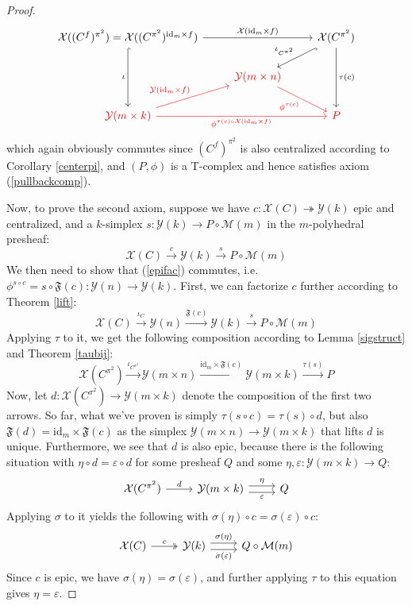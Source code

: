 \documentclass{article}
\theoremstyle{remark}
\theoremstyle{definition}
\newcommand{\id}{\mathrm{id}}
\newcommand{\Y}{\mathcal Y}
\newcommand{\X}{\mathcal X}
\newcommand{\F}{\mathfrak F}
\newcommand{\M}{\mathcal M}
\begin{document}
\begin{proof}
\[\begin{tikzcd}
			\X((C^f)^{\pi^2})=\X((C^{\pi^2})^{\id_m\times f})\arrow[hook]{dd}[swap]{\iota}\arrow{rr}{\X(\id_m\times f)}&&\X(C^{\pi^2})\arrow[hook]{ld}[swap]{\iota_{C^{\pi^2}}}\arrow{dd}{\tau(c)}\\
			&\color{red}{\Y(m\times n)}\arrow[color=red]{dr}[swap]{\phi^{\tau(c)}}\\
			\color{red}{\Y(m\times k)}\arrow[color=red]{ur}{\Y(\id_m\times f)}\arrow[color=red]{rr}[swap]{\phi^{\tau(c)\circ\X(\id_m\times f)}}&&\color{red}P
		\end{tikzcd}\]
		which again obviously commutes since $(C^f)^{\pi^2}$ is also centralized according to Corollary \ref{centerpi}, and $(P,\phi)$ is a T-complex and hence satisfies axiom (\ref{pullbackcomp}).
		
		Now, to prove the second axiom, suppose we have $c:\X(C)\twoheadrightarrow\Y(k)$ epic and centralized, and a $k$-simplex $s:\Y(k)\to P\circ\M(m)$ in the $m$-polyhedral presheaf:
		\[\X(C)\xrightarrow{c}\Y(k)\xrightarrow{s}P\circ\M(m)\]
		We then need to show that (\ref{epifac}) commutes, i.e. $\phi^{s\circ c}=s\circ\F(c):\Y(n)\to\Y(k)$. First, we can factorize $c$ further according to Theorem \ref{lift}:
		\[\X(C)\xrightarrow{\iota_C}\Y(n)\xrightarrow{\F(c)}\Y(k)\xrightarrow{s}P\circ\M(m)\]
		Applying $\tau$ to it, we get the following composition according to Lemma \ref{sigstruct} and Theorem \ref{taubij}:
		\[\X(C^{\pi^2})\xrightarrow{\iota_{C^{\pi^2}}}\Y(m\times n)\xrightarrow{\id_m\times\F(c)}\Y(m\times k)\xrightarrow{\tau(s)}P\]
		Now, let $d:\X(C^{\pi^2})\to\Y(m\times k)$ denote the composition of the first two arrows. So far, what we've proven is simply $\tau(s\circ c)=\tau(s)\circ d$, but also $\F(d)=\id_m\times\F(c)$ as the simplex $\Y(m\times n)\to\Y(m\times k)$ that lifts $d$ is unique. Furthermore, we see that $d$ is also epic, because there is the following situation with $\eta\circ d=\varepsilon\circ d$ for some presheaf $Q$ and some $\eta,\varepsilon:\Y(m\times k)\to Q$:
		\[\begin{tikzcd}
			\X(C^{\pi^2})\arrow{r}{d}&\Y(m\times k)\arrow[shift left=1mm]{r}{\eta}\arrow[shift right=1mm]{r}[swap]{\varepsilon}&Q
		\end{tikzcd}\]
		Applying $\sigma$ to it yields the following with $\sigma(\eta)\circ c=\sigma(\varepsilon)\circ c$:
		\[\begin{tikzcd}
			\X(C)\arrow[two heads]{r}{c}&\Y(k)\arrow[shift left=1mm]{r}{\sigma(\eta)}\arrow[shift right=1mm]{r}[swap]{\sigma(\varepsilon)}&Q\circ\M(m)
		\end{tikzcd}\]
		Since $c$ is epic, we have $\sigma(\eta)=\sigma(\varepsilon)$, and further applying $\tau$ to this equation gives $\eta=\varepsilon$.
		

\end{proof}
\end{document}
